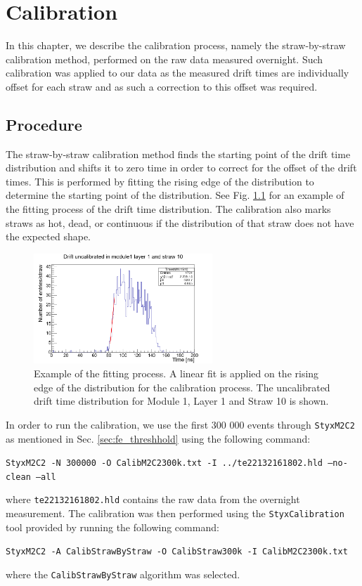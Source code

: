 \documentclass[a4paper]{report}
\numberwithin{equation}{section}
\begin{document}
\chapter{Calibration} \label{chap:calib}

In this chapter, we describe the calibration process, namely the straw-by-straw calibration method, performed 
on the raw data measured overnight. Such calibration was applied to our data as the measured drift times 
are individually offset for each straw and as such a correction to this offset was required.

\section{Procedure} \label{sec:calib_proc}

The straw-by-straw calibration method finds the starting point of the drift time distribution and shifts it to 
zero time in order to correct for the offset of the drift times. This is performed by fitting the rising edge of the 
distribution to determine the starting point of the distribution. See Fig. \ref{fig:calib_drift_fit} for an example of the fitting process of the 
drift time distribution. The calibration also marks straws as hot, dead, or continuous if the distribution of that straw 
does not have the expected shape. \par 

\begin{figure}[!h]
	\centering
	\includegraphics[width=0.6\textwidth]{calib_drift_m1l1s10_fit.png}
	\caption{Example of the fitting process. A linear fit is applied on the rising edge of the distribution for the calibration process. The uncalibrated drift time distribution
	 for Module 1, Layer 1 and Straw 10 is shown. }
	\label{fig:calib_drift_fit}
\end{figure}

In order to run the calibration, we use the first 300 000 events through \texttt{StyxM2C2} as mentioned in 
Sec. \ref{sec:fe_threshhold} using the following command:
\begin{tcolorbox}
	\texttt{StyxM2C2 -N 300000 -O CalibM2C2300k.txt -I ../te22132161802.hld --no-clean --all}
\end{tcolorbox}
where \texttt{te22132161802.hld} contains the raw data from the overnight measurement. The calibration was then performed using the \texttt{StyxCalibration} 
tool provided by running the following command:
\begin{tcolorbox}
	\texttt{StyxM2C2 -A CalibStrawByStraw -O CalibStraw300k -I CalibM2C2300k.txt}
\end{tcolorbox}
where the \texttt{CalibStrawByStraw} algorithm was selected. 
\end{document}
